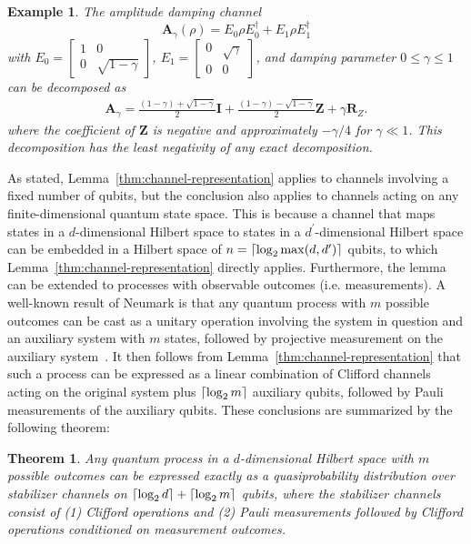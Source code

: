 \documentclass[twocolumn,pra]{revtex4}
\newtheorem{theorem}{Theorem}
\newtheorem{example}{Example}
\begin{document}
\begin{example}
The amplitude damping channel 
\begin{equation}
\label{eq:admodel}
\mathbf{A}_\gamma(\rho) = E_{0}\rho E_{0}^{\dagger}+E_{1}\rho E_{1}^{\dagger}
\end{equation}
with $E_{0}=\left[\begin{array}{cc}
1 & 0\\
0 & \sqrt{1-\gamma}
\end{array}\right]$, $E_{1}=\left[\begin{array}{cc}
0 & \sqrt{\gamma}\\
0 & 0
\end{array}\right]$, and damping parameter $0 \leq \gamma \leq 1$ can be decomposed as
\begin{gather}
\label{eq:addecom}
\mathbf{A}_\gamma = \frac{(1-\gamma)+\sqrt{1-\gamma}}{2}\mathbf{I}+\frac{(1-\gamma)-\sqrt{1-\gamma}}{2}\mathbf{Z}+\gamma\mathbf{R}_{Z}.
\end{gather}
where the coefficient of $\mathbf{Z}$ is negative and approximately $-\gamma/4$ for $\gamma\ll1$.  This decomposition has the least negativity of any exact decomposition.  
\end{example}
\par
As stated, Lemma~\ref{thm:channel-representation} applies to channels involving a fixed number of qubits, but the conclusion also applies to channels acting on any finite-dimensional quantum state space. This is because a channel that maps states in a $d$-dimensional Hilbert space to states in a $d^{\prime}$-dimensional Hilbert space can be embedded in a Hilbert space of $n=\left\lceil \log_{2}\max(d,d^{\prime}) \right\rceil$ qubits, to which Lemma~\ref{thm:channel-representation} directly applies. Furthermore, the lemma can be extended to processes with observable outcomes (i.e. measurements). A well-known result of Neumark is that any quantum process with $m$ possible outcomes can be cast as a unitary operation involving the system in question and an auxiliary system with $m$ states, followed by projective measurement on the auxiliary system~\cite{peres1990neumark,rabelo2006algorithm}. It then follows from Lemma~\ref{thm:channel-representation} that such a process can be expressed as a linear combination of Clifford channels acting on the original system plus $\left\lceil \log_2 m \right\rceil$ auxiliary qubits, followed by Pauli measurements of the auxiliary qubits. These conclusions are summarized by the following theorem:
\begin{theorem}
\label{thm:process-representation}
Any quantum process in a $d$-dimensional Hilbert space with $m$ possible outcomes can be expressed exactly as a quasiprobability distribution over stabilizer channels on $\left\lceil \log_2 d \right\rceil + \left\lceil \log_2 m \right\rceil$ qubits, where the stabilizer channels consist of (1) Clifford operations and (2) Pauli measurements followed by Clifford operations conditioned on measurement outcomes.
\end{theorem}
\end{document}
